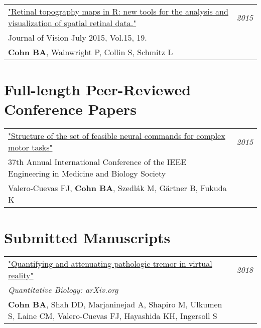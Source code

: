 \documentclass[10pt,a4paper]{article}
\begin{document}
\vspace*{1mm}\noindent\begin{tabularx}{17cm}{X r}
    \href{https://github.com/bc/resume/raw/master/papers/cohn_et_al_2015_jov.pdf}{"Retinal topography maps in R: new tools for the analysis and visualization of spatial retinal data."}  & \textit{2015}\\
    Journal of Vision July 2015, Vol.15, 19. \\
    \textbf{Cohn BA}, Wainwright P, Collin S, Schmitz L \\[2mm]
\end{tabularx}


\vspace*{3mm}\section*{Full-length Peer-Reviewed Conference Papers} 

\vspace*{1mm}\noindent\begin{tabularx}{17cm}{X r}
    \href{https://github.com/bc/resume/raw/master/papers/valero_cuevas_et_al_2015_ieee_embs.pdf}{"Structure of the set of feasible neural commands for complex motor tasks" } & \textit{2015}\\
    37th Annual International Conference of the IEEE Engineering in Medicine and Biology Society \\
    Valero-Cuevas FJ, \textbf{Cohn BA}, Szedl\'{a}k M, G{\"a}rtner B, Fukuda K \\[2mm]
\end{tabularx}


\vspace*{3mm}\section*{Submitted Manuscripts} 

\vspace*{1mm}\noindent\begin{tabularx}{17cm}{X r}
  \href{https://arxiv.org/pdf/1809.05970.pdf}{"Quantifying and attenuating pathologic tremor in virtual reality"} & \textit{2018} \\ %
  \textit{Quantitative Biology: arXiv.org} \\
  \textbf{Cohn BA}, Shah DD, Marjaninejad A, Shapiro M, Ulkumen S, Laine CM, Valero-Cuevas FJ, Hayashida KH, Ingersoll S \\[2mm]
\end{tabularx}
\end{document}
